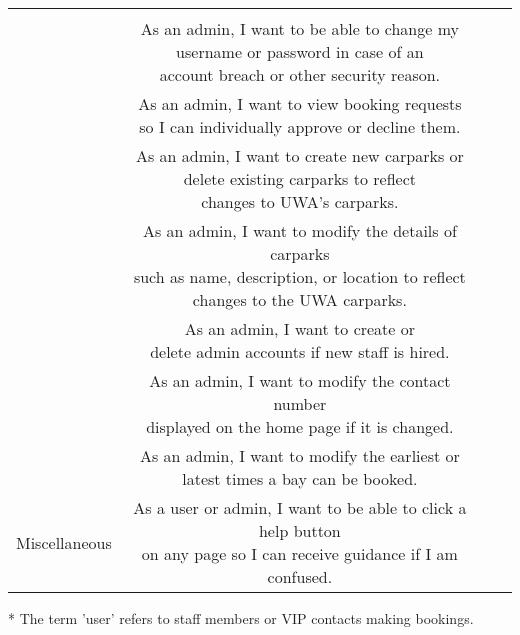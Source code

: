 \documentclass[a4paper, 10pt]{article}
\begin{document}
\begin{tabular}[hbt!]{|>{\centering\arraybackslash}m{7em}|c|c|c|}
{    so that I can manage the booking system.} \\
    \cline{2-2}
    & \makecell{As an admin, I want to be able to change my \\ 
    username or password in case of an \\
    account breach or other security reason.} \\
    \cline{2-2}
    \hline
    \multirow{6}{*}{Admin Panel} & 
    \makecell{As an admin, I want to view booking requests \\
    so I can individually approve or decline them.} \\
    \cline{2-2}
    & \makecell{As an admin, I want to create new carparks or \\
    delete existing carparks to reflect \\
    changes to UWA’s carparks.} \\
    \cline{2-2}
    & \makecell{As an admin, I want to modify the details of carparks \\
    such as name, description, or location to reflect \\
    changes to the UWA carparks.} \\
    \cline{2-2}
    & \makecell{As an admin, I want to create or \\ 
    delete admin accounts if new staff is hired.} \\
    \cline{2-2}
    & \makecell{As an admin, I want to modify the contact number \\
    displayed on the home page if it is changed.} \\
    \cline{2-2}
    & \makecell{As an admin, I want to modify the earliest or \\ 
    latest times a bay can be booked.} \\
    \cline{2-2}
    \hline
    Miscellaneous & 
    \makecell{As a user or admin, I want to be able to click a help button \\
    on any page so I can receive guidance if I am confused.} \\
    \cline{2-2}
    \hline
\end{tabular}

\vspace{1em}
* The term 'user' refers to staff members or VIP contacts making bookings.
\end{document}
